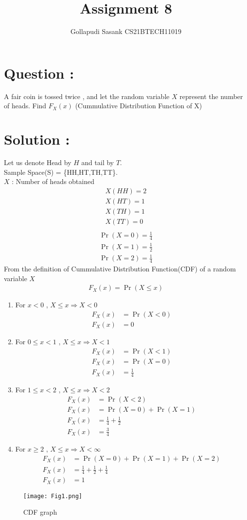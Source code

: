 \documentclass[journal,twocolumn]{IEEEtran}
\title{Assignment 8}
\author{Gollapudi Sasank CS21BTECH11019}
\providecommand{\pr}[1]{\ensuremath{\Pr\left(#1\right)}}
\begin{document}
\maketitle
\section*{Question : }
A fair coin is tossed twice , and let the random variable $X$ represent the number of heads. Find $F_X(x)$ (Cummulative Distribution Function of X)
\section*{Solution : }
Let us denote Head by $H$ and tail by $T$. \\
Sample Space(S) = \{HH,HT,TH,TT\}.\\
$X$ : Number of heads obtained \\
\begin{align}
X(HH) = 2 \\
X(HT) = 1 \\
X(TH) = 1 \\
X(TT) = 0 \\
\end{align}
\begin{align}
\pr{X=0} = \frac{1}{4} \\
\pr{X=1} = \frac{1}{2} \\
\pr{X=2} = \frac{1}{4}
\end{align}
From the definition of Cummulative Distribution Function(CDF) of a random variable $X$ 
\begin{align}
F_X(x) = \pr{X \le x}
\end{align}
\begin{enumerate}
\item For $x<0 $ , $X \le x \Rightarrow X<0$
\begin{align}
F_X(x) &= \pr{X<0} \\
F_X(x) &= 0
\end{align}
\item For $0 \le x < 1 $ , $X \le x \Rightarrow X<1$
\begin{align}
F_X(x) &= \pr{X < 1} \\
F_X(x) &= \pr{X=0} \\
F_X(x) &= \frac{1}{4}
\end{align}
\item For $ 1 \le x < 2$ , $X \le x \Rightarrow X<2$
\begin{align}
F_X(x) &= \pr{X < 2} \\
F_X(x) &= \pr{X=0} + \pr{X=1}  \\
F_X(x) &= \frac{1}{4} + \frac{1}{2} \\
F_X(x) &= \frac{3}{4}  
\end{align}
\item For $ x \ge 2 $ , $X \le x \Rightarrow X<\infty$
\begin{align}
F_X(x) &= \pr{X=0} + \pr{X=1} + \pr{X=2} \\
F_X(x) &= \frac{1}{4} + \frac{1}{2} + \frac{1}{4} \\
F_X(x) &= 1
\end{align}
\end{enumerate}
\begin{figure}[h]
\centering
\texttt{[image: Fig1.png]}
\caption{CDF graph}
\label{Fig 1}
\end{figure}
\end{document}
